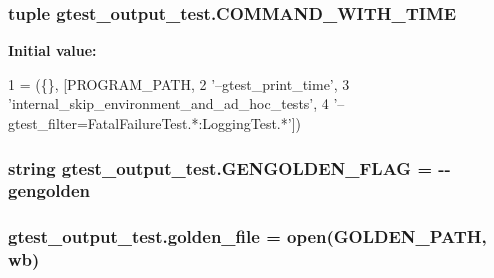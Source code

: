 \subsubsection[{\texorpdfstring{C\+O\+M\+M\+A\+N\+D\+\_\+\+W\+I\+T\+H\+\_\+\+T\+I\+ME}{COMMAND_WITH_TIME}}]{\setlength{\rightskip}{0pt plus 5cm}tuple gtest\+\_\+output\+\_\+test.\+C\+O\+M\+M\+A\+N\+D\+\_\+\+W\+I\+T\+H\+\_\+\+T\+I\+ME}\hypertarget{namespacegtest__output__test_a1c27d93a57990d21461436f2d5ff3064}{}\label{namespacegtest__output__test_a1c27d93a57990d21461436f2d5ff3064}
{\bfseries Initial value\+:}
\begin{DoxyCode}
1 = (\{\}, [PROGRAM\_PATH,
2                           \textcolor{stringliteral}{'--gtest\_print\_time'},
3                           \textcolor{stringliteral}{'internal\_skip\_environment\_and\_ad\_hoc\_tests'},
4                           \textcolor{stringliteral}{'--gtest\_filter=FatalFailureTest.*:LoggingTest.*'}])
\end{DoxyCode}
\subsubsection[{\texorpdfstring{G\+E\+N\+G\+O\+L\+D\+E\+N\+\_\+\+F\+L\+AG}{GENGOLDEN_FLAG}}]{\setlength{\rightskip}{0pt plus 5cm}string gtest\+\_\+output\+\_\+test.\+G\+E\+N\+G\+O\+L\+D\+E\+N\+\_\+\+F\+L\+AG = \textquotesingle{}-\/-\/gengolden\textquotesingle{}}\hypertarget{namespacegtest__output__test_a25addad68fc28461f31e7f473bb7643f}{}\label{namespacegtest__output__test_a25addad68fc28461f31e7f473bb7643f}
\subsubsection[{\texorpdfstring{golden\+\_\+file}{golden_file}}]{\setlength{\rightskip}{0pt plus 5cm}gtest\+\_\+output\+\_\+test.\+golden\+\_\+file = open({\bf G\+O\+L\+D\+E\+N\+\_\+\+P\+A\+TH}, \textquotesingle{}wb\textquotesingle{})}\hypertarget{namespacegtest__output__test_a0a02ae5e249d93c376bbce6fb87f9405}{}\label{namespacegtest__output__test_a0a02ae5e249d93c376bbce6fb87f9405}
